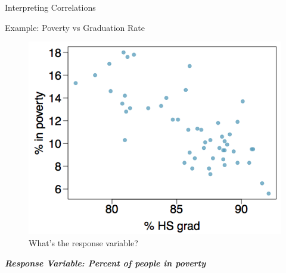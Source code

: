\documentclass[
  ignorenonframetext,
]{beamer}
\begin{document}
\begin{frame}{Interpreting Correlations}
\label{interpreting-correlations}
\begin{center}

\end{center}
\end{frame}

\begin{frame}{Example: Poverty vs Graduation Rate}
\label{example-poverty-vs-graduation-rate}
\begin{figure}[H]

{\centering \includegraphics{class31_files/mediabag/poverty-vs-grad-rate.png}

}

\caption{What's the response variable?}

\end{figure}%

\pause

\textbf{\emph{Response Variable: Percent of people in poverty}}
\end{frame}
\end{document}
